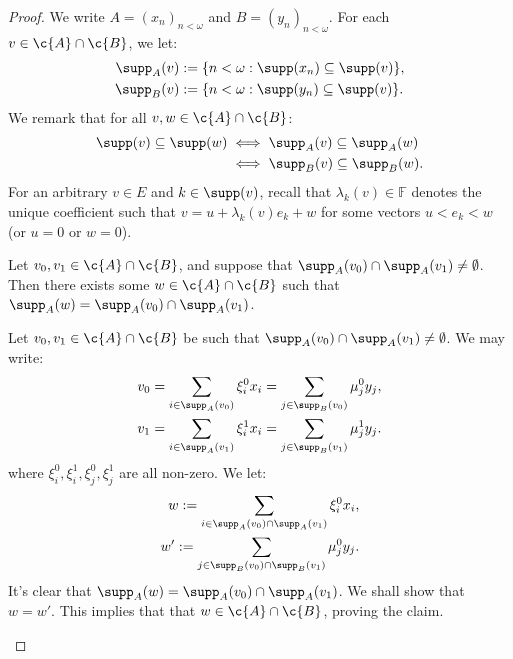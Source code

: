 \documentclass[11pt,reqno]{amsart}
\begin{document}
\begin{proof}
    We write $A = (x_n)_{n<\omega}$ and $B = (y_n)_{n<\omega}$. For each $v \in \c{A} \cap \c{B}$, we let:
    \begin{align*}
        \supp_A(v) &:= \{n < \omega : \supp(x_n) \subseteq \supp(v)\}, \\
        \supp_B(v) &:= \{n < \omega : \supp(y_n) \subseteq \supp(v)\}.
    \end{align*}
    We remark that for all $v,w \in \c{A} \cap \c{B}$:
    \begin{align*}
        \supp(v) \subseteq \supp(w) &\iff \supp_A(v) \subseteq \supp_A(w) \\
        &\iff \supp_B(v) \subseteq \supp_B(w).
    \end{align*}
    For an arbitrary $v \in E$ and $k \in \supp(v)$, recall that $\lambda_k(v) \in \mathbb{F}$ denotes the unique coefficient such that $v = u + \lambda_k(v)e_k + w$ for some vectors $u < e_k < w$ (or $u = 0$ or $w = 0$).

    \begin{claim}
    \label{claim:supp(v).intersection}
        Let $v_0,v_1 \in \c{A} \cap \c{B}$, and suppose that $\supp_A(v_0) \cap \supp_A(v_1) \neq \emptyset$. Then there exists some $w \in \c{A} \cap \c{B}$ such that $\supp_A(w) = \supp_A(v_0) \cap \supp_A(v_1)$.
    \end{claim}

    \begin{midproof}
        Let $v_0,v_1 \in \c{A} \cap \c{B}$ be such that $\supp_A(v_0) \cap \supp_A(v_1) \neq \emptyset$. We may write:
        \begin{align}
            v_0 &= \sum_{i \in \supp_A(v_0)} \xi_i^0x_i = \sum_{j \in \supp_B(v_0)} \mu_j^0y_j, \label{eq:v_0} \\
            v_1 &= \sum_{i \in \supp_A(v_1)} \xi_i^1x_i = \sum_{j \in \supp_B(v_1)} \mu_j^1y_j. \label{eq:v_1}
        \end{align}
        where $\xi_i^0,\xi_i^1,\xi_j^0,\xi_j^1$ are all non-zero. We let:
        \begin{align*}
            w := \sum_{i \in \supp_A(v_0) \cap \supp_A(v_1)} \xi_i^0 x_i, \\
            w' := \sum_{j \in \supp_B(v_0) \cap \supp_B(v_1)} \mu_j^0 y_j.
        \end{align*}
        It's clear that $\supp_A(w) = \supp_A(v_0) \cap \supp_A(v_1)$. We shall show that $w = w'$. This implies that that $w \in \c{A} \cap \c{B}$, proving the claim.


\end{midproof}
\end{proof}
\end{document}
